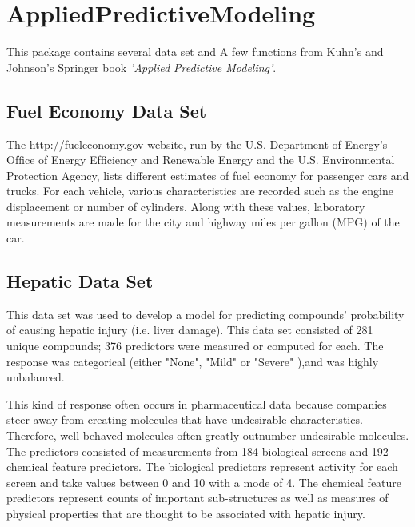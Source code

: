 \documentclass[main.tex]{subfiles}
\begin{document}
\section{AppliedPredictiveModeling}
This package contains several data set and A few functions from Kuhn's and Johnson's Springer book \emph{'Applied Predictive Modeling'}.

\subsection{Fuel Economy Data Set}
The http://fueleconomy.gov website, run by the U.S. Department of Energy’s Ofﬁce of Energy
Efﬁciency and Renewable Energy and the U.S. Environmental Protection Agency, lists different
estimates of fuel economy for passenger cars and trucks. For each vehicle, various characteristics
are recorded such as the engine displacement or number of cylinders. Along with these values,
laboratory measurements are made for the city and highway miles per gallon (MPG) of the car.

\subsection{Hepatic Data Set}
This data set was used to develop a model for predicting compounds’ probability of causing hepatic
injury (i.e. liver damage). This data set consisted of 281 unique compounds; 376 predictors were
measured or computed for each. The response was categorical (either "None", "Mild" or "Severe"
),and was highly unbalanced.

This kind of response often occurs in pharmaceutical data because companies steer away from
creating molecules that have undesirable characteristics. Therefore, well-behaved molecules often
greatly outnumber undesirable molecules. The predictors consisted of measurements from 184
biological screens and 192 chemical feature predictors. 
The biological predictors represent activity
for each screen and take values between 0 and 10 with a mode of 4. The chemical feature predictors
represent counts of important sub-structures as well as measures of physical properties that are
thought to be associated with hepatic injury.
\end{document}
